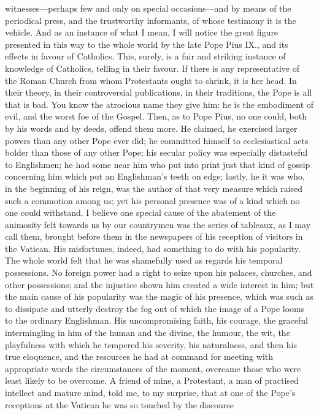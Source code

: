 witnesses—perhaps few and only on special occasions—and by means
of the periodical press, and the trustworthy informants, of whose
testimony it is the vehicle. And as an instance of what I mean, I will
notice the great figure presented in this way to the whole world by
the late Pope Pius IX., and its effects in favour of Catholics. This,
surely, is a fair and striking instance of knowledge of Catholics,
telling in their favour. If there is any representative of the Roman
Church from whom Protestants ought to shrink, it is her head. In their
theory, in their controversial publications, in their traditions, the
Pope is all that is bad. You know the atrocious name they give him: he
is the embodiment of evil, and the worst foe of the Gospel. Then, as
to Pope Pius, no one could, both by his words and by deeds, offend
them more. He claimed, he exercised larger powers than any other Pope
ever did; he committed himself to ecclesiastical acts bolder than
those of any other Pope; his secular policy was especially distasteful
to Englishmen; he had some near him who put into print just that kind
of gossip concerning him which put an Englishman's teeth on edge;
lastly, he it was who, in the beginning of his reign, was the author
of that very measure which raised such a commotion among us; yet his
personal presence was of a kind which no one could withstand. I
believe one special cause of the abatement of the animosity felt
towards us by our countrymen was the series of tableaux, as I may call
them, brought before them in the newspapers of his reception of
visitors in the Vatican. His misfortunes, indeed, had something to do
with his popularity. The whole world felt that he was shamefully used
as regards his temporal possessions. No foreign power had a right to
seize upon his palaces, churches, and other possessions; and the
injustice shown him created a wide interest in him; but the main cause
of his popularity was the magic of his presence, which was such as to
dissipate and utterly destroy the fog out of which the image of a Pope
looms to the ordinary Englishman. His uncompromising faith, his
courage, the graceful intermingling in him of the human and the
divine, the humour, the wit, the playfulness with which he tempered
his severity, his naturalness, and then his true eloquence, and the
resources he had at command for meeting with appropriate words the
circumstances of the moment, overcame those who were least likely to
be overcome. A friend of mine, a Protestant, a man of practised
intellect and mature mind, told me, to my surprise, that at one of the
Pope's receptions at the Vatican he was so touched by the discourse
